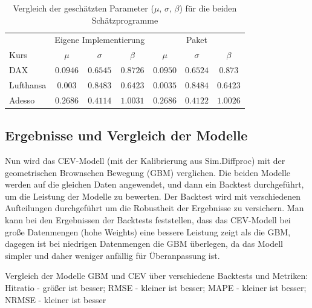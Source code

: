 \begin{table}[H]
\centering
\caption{Vergleich der geschätzten Parameter ($\mu$, $\sigma$, $\beta$) für die beiden Schätzprogramme}
\label{tab:compare_models_ab}
\begin{tabular}{lcccccc}
\hline
 & \multicolumn{3}{c}{Eigene Implementierung} & \multicolumn{3}{c}{Paket} \\
\cline{2-4}\cline{5-7}
Kurs & $\mu$ & $\sigma$ & $\beta$ & $\mu$ & $\sigma$ & $\beta$ \\
\hline
DAX & $0.0946$ & $0.6545$ & $0.8726$ & $0.0950$ & $0.6524$ & $0.873$ \\
Lufthansa & $0.003$ & $0.8483$ & $0.6423$ & $0.0035$ & $0.8484$ & $0.6423$ \\
Adesso & $0.2686$ & $0.4114$ & $1.0031$ & $0.2686$ & $0.4122$ & $1.0026$ \\
\hline
\end{tabular}
\end{table}

\subsection{Ergebnisse und Vergleich der Modelle}

Nun wird das CEV-Modell (mit der Kalibrierung aus Sim.Diffproc) mit der geometrischen Brownschen Bewegung (GBM) verglichen. Die beiden Modelle werden auf die gleichen Daten angewendet, und dann ein Backtest durchgeführt, um die Leistung der Modelle zu bewerten.
Der Backtest wird mit verschiedenen Aufteilungen durchgeführt um die Robustheit der Ergebnisse zu versichern.
Man kann bei den Ergebnissen der Backtests feststellen, dass das CEV-Modell bei große Datenmengen (hohe Weights) eine bessere Leistung zeigt als die GBM, dagegen ist bei niedrigen Datenmengen
die GBM überlegen, da das Modell simpler und daher weniger anfällig für Überanpassung ist.

\begin{table}
\centering
{}
\caption{Vergleich der Modelle GBM und CEV über verschiedene Backtests und Metriken: Hitratio - größer ist besser; RMSE - kleiner ist besser; MAPE - kleiner ist besser; NRMSE - kleiner ist besser}
\end{table}
